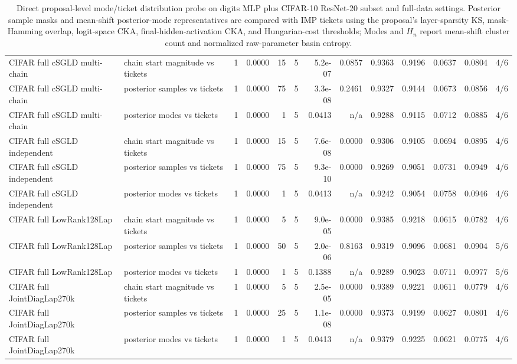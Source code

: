 \begin{table}[t]
{\begin{tabular}{llrrrrrrrrrrr}
CIFAR full cSGLD multi-chain & chain start magnitude vs tickets & 1 & 0.0000 & 15 & 5 & 5.2e-07 & 0.0857 & 0.9363 & 0.9196 & 0.0637 & 0.0804 & 4/6 \\
CIFAR full cSGLD multi-chain & posterior samples vs tickets & 1 & 0.0000 & 75 & 5 & 3.3e-08 & 0.2461 & 0.9327 & 0.9144 & 0.0673 & 0.0856 & 4/6 \\
CIFAR full cSGLD multi-chain & posterior modes vs tickets & 1 & 0.0000 & 1 & 5 & 0.0413 & n/a & 0.9288 & 0.9115 & 0.0712 & 0.0885 & 4/6 \\
CIFAR full cSGLD independent & chain start magnitude vs tickets & 1 & 0.0000 & 15 & 5 & 7.6e-08 & 0.0000 & 0.9306 & 0.9105 & 0.0694 & 0.0895 & 4/6 \\
CIFAR full cSGLD independent & posterior samples vs tickets & 1 & 0.0000 & 75 & 5 & 9.3e-10 & 0.0000 & 0.9269 & 0.9051 & 0.0731 & 0.0949 & 4/6 \\
CIFAR full cSGLD independent & posterior modes vs tickets & 1 & 0.0000 & 1 & 5 & 0.0413 & n/a & 0.9242 & 0.9054 & 0.0758 & 0.0946 & 4/6 \\
CIFAR full LowRank128Lap & chain start magnitude vs tickets & 1 & 0.0000 & 5 & 5 & 9.0e-05 & 0.0000 & 0.9385 & 0.9218 & 0.0615 & 0.0782 & 4/6 \\
CIFAR full LowRank128Lap & posterior samples vs tickets & 1 & 0.0000 & 50 & 5 & 2.0e-06 & 0.8163 & 0.9319 & 0.9096 & 0.0681 & 0.0904 & 5/6 \\
CIFAR full LowRank128Lap & posterior modes vs tickets & 1 & 0.0000 & 1 & 5 & 0.1388 & n/a & 0.9289 & 0.9023 & 0.0711 & 0.0977 & 5/6 \\
CIFAR full JointDiagLap270k & chain start magnitude vs tickets & 1 & 0.0000 & 5 & 5 & 2.5e-05 & 0.0000 & 0.9389 & 0.9221 & 0.0611 & 0.0779 & 4/6 \\
CIFAR full JointDiagLap270k & posterior samples vs tickets & 1 & 0.0000 & 25 & 5 & 1.1e-08 & 0.0000 & 0.9373 & 0.9199 & 0.0627 & 0.0801 & 4/6 \\
CIFAR full JointDiagLap270k & posterior modes vs tickets & 1 & 0.0000 & 1 & 5 & 0.0413 & n/a & 0.9379 & 0.9225 & 0.0621 & 0.0775 & 4/6 \\
\bottomrule
\end{tabular}
}%
\caption{Direct proposal-level mode/ticket distribution probe on
digits MLP plus CIFAR-10 ResNet-20 subset and full-data settings. Posterior sample masks
and mean-shift posterior-mode representatives are compared with
IMP tickets using the proposal's layer-sparsity KS, mask-Hamming
overlap, logit-space CKA, final-hidden-activation CKA, and
Hungarian-cost thresholds; Modes and $H_n$ report mean-shift
cluster count and normalized raw-parameter basin entropy.}
\label{tab:direct-mode-ticket-distribution}
\end{table}

